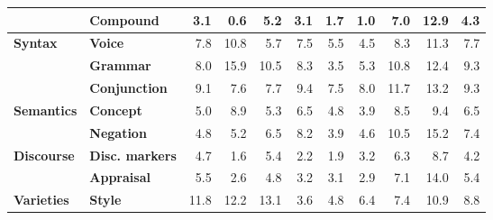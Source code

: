 \begin{table}[h]
{\begin{tabular}{llrrrrrrrrr}
  & \textbf{Compound} & \cellcolor{blue!8} 3.1 & \cellcolor{blue!2} 0.6 & \cellcolor{blue!13} 5.2 & \cellcolor{blue!8} 3.1 & \cellcolor{blue!4} 1.7 & \cellcolor{blue!3} 1.0 & \cellcolor{blue!18} 7.0 & \cellcolor{blue!33} 12.9 & \cellcolor{blue!11} 4.3 \\
\midrule
\textbf{Syntax} & \textbf{Voice} & \cellcolor{blue!20} 7.8 & \cellcolor{blue!28} 10.8 & \cellcolor{blue!15} 5.7 & \cellcolor{blue!19} 7.5 & \cellcolor{blue!14} 5.5 & \cellcolor{blue!11} 4.5 & \cellcolor{blue!21} 8.3 & \cellcolor{blue!29} 11.3 & \cellcolor{blue!20} 7.7 \\
  & \textbf{Grammar} & \cellcolor{blue!21} 8.0 & \cellcolor{blue!41} 15.9 & \cellcolor{blue!27} 10.5 & \cellcolor{blue!21} 8.3 & \cellcolor{blue!9} 3.5 & \cellcolor{blue!14} 5.3 & \cellcolor{blue!28} 10.8 & \cellcolor{blue!32} 12.4 & \cellcolor{blue!24} 9.3 \\
  & \textbf{Conjunction} & \cellcolor{blue!24} 9.1 & \cellcolor{blue!20} 7.6 & \cellcolor{blue!20} 7.7 & \cellcolor{blue!24} 9.4 & \cellcolor{blue!19} 7.5 & \cellcolor{blue!21} 8.0 & \cellcolor{blue!30} 11.7 & \cellcolor{blue!34} 13.2 & \cellcolor{blue!24} 9.3 \\
\midrule
\textbf{Semantics} & \textbf{Concept} & \cellcolor{blue!13} 5.0 & \cellcolor{blue!23} 8.9 & \cellcolor{blue!14} 5.3 & \cellcolor{blue!17} 6.5 & \cellcolor{blue!12} 4.8 & \cellcolor{blue!10} 3.9 & \cellcolor{blue!22} 8.5 & \cellcolor{blue!24} 9.4 & \cellcolor{blue!17} 6.5 \\
  & \textbf{Negation} & \cellcolor{blue!12} 4.8 & \cellcolor{blue!14} 5.2 & \cellcolor{blue!17} 6.5 & \cellcolor{blue!21} 8.2 & \cellcolor{blue!10} 3.9 & \cellcolor{blue!12} 4.6 & \cellcolor{blue!27} 10.5 & \cellcolor{blue!39} 15.2 & \cellcolor{blue!19} 7.4 \\
\midrule
\textbf{Discourse} & \textbf{Disc. markers} & \cellcolor{blue!12} 4.7 & \cellcolor{blue!4} 1.6 & \cellcolor{blue!14} 5.4 & \cellcolor{blue!6} 2.2 & \cellcolor{blue!5} 1.9 & \cellcolor{blue!8} 3.2 & \cellcolor{blue!16} 6.3 & \cellcolor{blue!22} 8.7 & \cellcolor{blue!11} 4.2 \\
  & \textbf{Appraisal} & \cellcolor{blue!14} 5.5 & \cellcolor{blue!7} 2.6 & \cellcolor{blue!12} 4.8 & \cellcolor{blue!8} 3.2 & \cellcolor{blue!8} 3.1 & \cellcolor{blue!8} 2.9 & \cellcolor{blue!18} 7.1 & \cellcolor{blue!36} 14.0 & \cellcolor{blue!14} 5.4 \\
\midrule
\textbf{Varieties} & \textbf{Style} & \cellcolor{blue!30} 11.8 & \cellcolor{blue!32} 12.2 & \cellcolor{blue!34} 13.1 & \cellcolor{blue!9} 3.6 & \cellcolor{blue!12} 4.8 & \cellcolor{blue!17} 6.4 & \cellcolor{blue!19} 7.4 & \cellcolor{blue!28} 10.9 & \cellcolor{blue!23} 8.8 \\

\end{tabular}}
\end{table}
